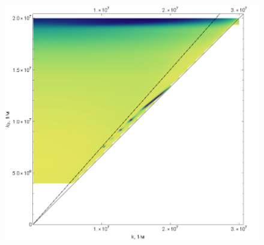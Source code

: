 \begin{figure}
	\centering
	\includegraphics[width=0.7\linewidth]{screenshot009}
	\caption{}
	\label{fig:screenshot009}
\end{figure}

 